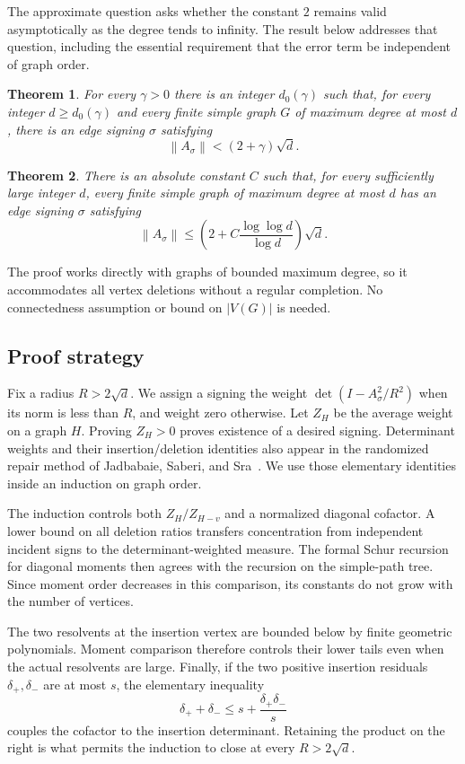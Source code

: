 \documentclass[11pt]{article}
\numberwithin{equation}{section}
\newtheorem{theorem}{Theorem}[section]
\theoremstyle{remark}
\newcommand{\norm}[1]{\left\lVert#1\right\rVert}
\begin{document}
The approximate question asks whether the constant $2$ remains
valid asymptotically as the degree tends to infinity. The result
below addresses that question, including the essential requirement
that the error term be independent of graph order.

\begin{theorem}\label{thm:main}
For every $\gamma>0$ there is an integer $d_0(\gamma)$ such that,
for every integer $d\ge d_0(\gamma)$ and every finite simple graph
$G$ of maximum degree at most $d$, there is an edge signing
$\sigma$ satisfying
\[
 \norm{A_\sigma}<(2+\gamma)\sqrt d.
\]
\end{theorem}

\begin{theorem}\label{thm:rate}
There is an absolute constant $C$ such that, for every sufficiently
large integer $d$, every finite simple graph of maximum degree at
most $d$ has an edge signing $\sigma$ satisfying
\[
 \norm{A_\sigma}
 \le \left(2+C\frac{\log\log d}{\log d}\right)\sqrt d.
\]
\end{theorem}

The proof works directly with graphs of bounded maximum degree,
so it accommodates all vertex deletions without a regular
completion. No connectedness assumption or bound on $|V(G)|$ is
needed.

\subsection{Proof strategy}

Fix a radius $R>2\sqrt d$. We assign a signing the weight
$\det(I-A_\sigma^2/R^2)$ when its norm is less than $R$, and weight
zero otherwise. Let $Z_H$ be the average weight on a graph $H$.
Proving $Z_H>0$ proves existence of a desired signing.
Determinant weights and their insertion/deletion identities also
appear in the randomized repair method of
Jadbabaie, Saberi, and Sra~\cite[Section~6]{JSS}. We use those
elementary identities inside an induction on graph order.

The induction controls both $Z_H/Z_{H-v}$ and a normalized diagonal
cofactor. A lower bound on all deletion ratios transfers
concentration from independent incident signs to the
determinant-weighted measure. The formal Schur recursion for
diagonal moments then agrees with the recursion on the simple-path
tree. Since moment order decreases in this comparison, its
constants do not grow with the number of vertices.

The two resolvents at the insertion vertex are bounded below by
finite geometric polynomials. Moment comparison therefore
controls their lower tails even when the actual resolvents are
large. Finally, if the two positive insertion residuals
$\delta_+,\delta_-$ are at most $s$, the elementary inequality
\[
 \delta_++\delta_-\le s+\frac{\delta_+\delta_-}{s}
\]
couples the cofactor to the insertion determinant. Retaining the
product on the right is what permits the induction to close at
every $R>2\sqrt d$.
\end{document}
